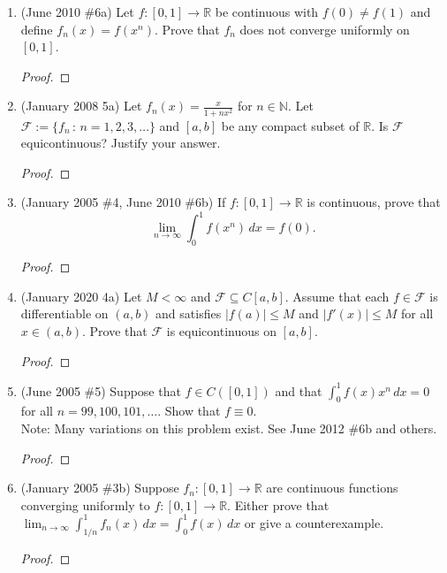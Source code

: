 \documentclass[reqno]{article}
\theoremstyle{remark}
\numberwithin{equation}{section}
\newcommand{\N}{\mathbb{N}}
\newcommand{\R}{\mathbb{R}}
\begin{document}
\begin{enumerate}
	\item (June 2010 \#6a) Let $f:[0,1]\to\R$ be continuous with $f(0)\neq f(1)$ and define $f_n(x)=f(x^n)$. Prove that $f_n$ does not converge uniformly on $[0,1]$. 
	
	
	\begin{proof}
    
    \end{proof}
	
	\item (January 2008 5a) Let $f_n(x) = \frac{x}{1+nx^2}$ for $n \in \N$. Let $\mathcal{F} := \{f_n \, \colon \, n = 1, 2, 3, \ldots\}$ and $[a,b]$ be any compact subset of $\R$. Is $\mathcal{F}$ equicontinuous? Justify your answer. 
	
	\begin{proof}
    
    \end{proof}
	
	\item (January 2005 \#4, June 2010 \#6b) If $f:[0,1]\to\R$ is continuous, prove that $$\displaystyle\lim_{n\to\infty}\int_0^1 f(x^n)\,dx=f(0).$$
	
	\begin{proof}
    
    \end{proof}
	
	\item (January 2020 4a) Let $M<\infty$ and $\mathcal{F} \subseteq C[a,b]$. Assume that each $f \in \mathcal{F}$ is differentiable on $(a,b)$ and satisfies $|f(a)| \leq M$ and $|f'(x)| \leq M$ for all $x \in (a,b)$. Prove that $\mathcal{F}$ is equicontinuous on $[a,b]$. 
	
	\begin{proof}
    
    \end{proof}
	
	  


		
	\item (June 2005 \#5) Suppose that $f\in C([0,1])$ and that $\displaystyle \int_0^1 f(x)x^n\,dx=0$ for all $n=99,100,101,\ldots$. Show that $f\equiv 0$.\\
	Note: Many variations on this problem exist. See June 2012 \#6b and others. 
	
	\begin{proof}
    
    \end{proof}
		
	\item (January 2005 \#3b) Suppose $f_n:[0,1]\to\R$ are continuous functions converging uniformly to $f:[0,1]\to\R$. Either prove that $\displaystyle\lim_{n\to\infty}\int_{1/n}^1 f_n(x)\,dx=\int_0^1 f(x)\,dx$ or give a counterexample.
	
	
	\begin{proof}
    
    \end{proof}

\end{enumerate}
\end{document}
